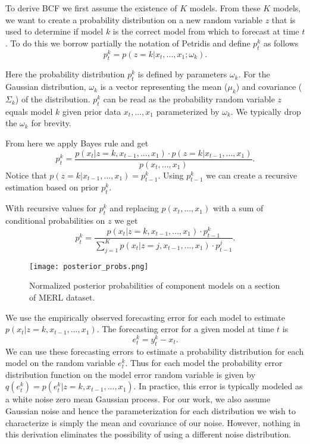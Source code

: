 To derive BCF we first assume the existence of $K$ models.  From these $K$ models, we want to create a probability distribution on a new random variable $z$ that is used to determine if model $k$ is the correct model from which to forecast at time $t$.  To do this we borrow partially the notation of Petridis \cite{Petridis2001} and define $p_{t}^{k}$ as follows
\begin{equation}
p_{t}^{k} = p(z = k | x_{t}, ..., x_{1};\omega_{k}).
\end{equation}

Here the probability distribution $p_{t}^{k}$ is defined by parameters $\omega_{k}$.  For the Gaussian distribution, $\omega_{k}$ is a vector representing the mean ($\mu_{k}$) and covariance ($\Sigma_{k}$) of the distribution.  $p_{t}^{k}$ can be read as the probability random variable $z$ equals model $k$ given prior data $x_{t}, ..., x_{1}$ parameterized by $\omega_{k}$.  We typically drop the $\omega_{k}$ for brevity.

From here we apply Bayes rule and get
\begin{equation}
p_{t}^{k} = \frac{p(x_{t} | z = k, x_{t - 1}, ..., x_{1}) \cdot p(z = k | x_{t - 1}, ..., x_{1})} {p(x_{t}, ..., x_{1})}.
\end{equation}
\noindent
Notice that $p(z = k | x_{t - 1}, ..., x_{1}) = p_{t - 1}^{k}$.  Using $p_{t - 1}^{k}$ we can create a recursive estimation based on prior $p_{t}^{k}$.

With recursive values for $p_{t}^{k}$ and replacing $p(x_{t}, ..., x_{1})$ with a sum of conditional probabilities on $z$ we get
\begin{equation}
p_{t}^{k} = \frac{p(x_{t} | z = k, x_{t - 1}, ..., x_{1}) \cdot p_{t - 1}^{k}} {\sum_{j = 1}^{K}p(x_{t} | z = j, x_{t - 1}, ..., x_{1}) \cdot p_{t - 1}^{j}}.
\end{equation}

\begin{figure}[t!]
\centering
\texttt{[image: posterior\_probs.png]}
\caption{Normalized posterior probabilities of component models on a section of MERL dataset.}
\label{fig:probsmerl}
\end{figure}

We use the empirically observed forecasting error for each model to estimate $p(x_{t}|z = k, x_{t - 1}, ..., x_{1})$.  The forecasting error for a given model at time $t$ is 
\begin{equation}
e_{t}^{k} = y_{t}^{k} - x_{t}.
\end{equation}
\noindent
We can use these forecasting errors to estimate a probability distribution for each model on the random variable $e_{t}^{k}$.  Thus for each model the probability error distribution function on the model error random variable is given by $q(e_{t}^{k}) = p(e_{t}^{k}|z = k, x_{t - 1}, ..., x_{1})$.  In practice, this error is typically modeled as a white noise zero mean Gaussian process.  For our work, we also assume Gaussian noise and hence the parameterization for each distribution we wish to characterize is simply the mean and covariance of our noise.  However, nothing in this derivation eliminates the possibility of using a different noise distribution.

